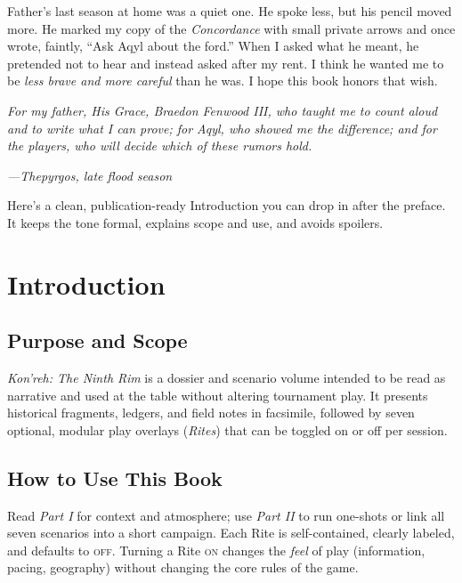\documentclass[11pt]{article}
\begin{document}
Father's last season at home was a quiet one. He spoke less, but his pencil moved more. He marked my copy of the \emph{Concordance} with small private arrows and once wrote, faintly, ``Ask Aqyl about the ford.'' When I asked what he meant, he pretended not to hear and instead asked after my rent. I think he wanted me to be \textit{less brave and more careful} than he was. I hope this book honors that wish.

\medskip
\noindent\textit{For my father, His Grace, Braedon Fenwood III, who taught me to count aloud and to write what I can prove; for Aqyl, who showed me the difference; and for the players, who will decide which of these rumors hold.}

\begin{flushright}
\textit{—Thepyrgos, late flood season}
\end{flushright}


Here’s a clean, publication-ready Introduction you can drop in after the preface. It keeps the tone formal, explains scope and use, and avoids spoilers.

\section*{Introduction}
\label{sec:introduction}
{}

\subsection*{Purpose and Scope}
\textit{Kon'reh: The Ninth Rim} is a dossier and scenario volume intended to be read as narrative and used at the table without altering tournament play. It presents historical fragments, ledgers, and field notes in facsimile, followed by seven optional, modular play overlays (\emph{Rites}) that can be toggled on or off per session.

\subsection*{How to Use This Book}
Read \emph{Part I} for context and atmosphere; use \emph{Part II} to run one-shots or link all seven scenarios into a short campaign. Each Rite is self-contained, clearly labeled, and defaults to \textsc{off}. Turning a Rite \textsc{on} changes the \emph{feel} of play (information, pacing, geography) without changing the core rules of the game.
\end{document}
